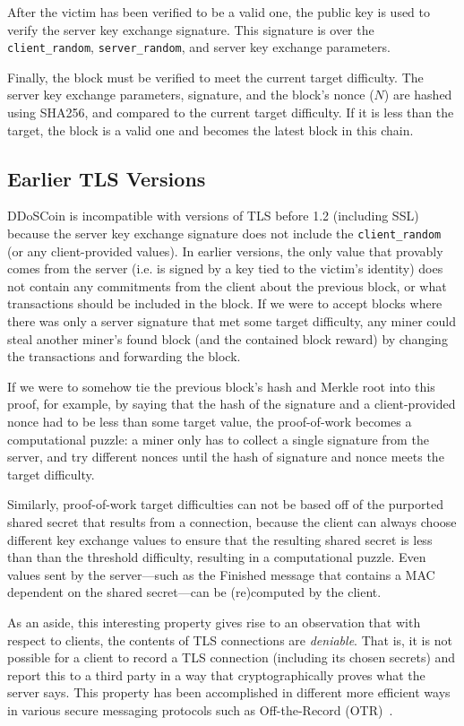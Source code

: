 After the victim has been verified to be a valid one, the public key is used to
verify the server key exchange signature. This signature is over the
\texttt{client\_random}, \texttt{server\_random}, and server key exchange
parameters.

Finally, the block must be verified to meet the current target difficulty. The
server key exchange parameters, signature, and the block's nonce ($N$) are
hashed using SHA256, and compared to the current target difficulty. If it is
less than the target, the block is a valid one and becomes the latest block in
this chain.

\subsection{Earlier TLS Versions}

DDoSCoin is incompatible with versions of TLS before 1.2 (including SSL) because
the server key exchange signature does not include the \texttt{client\_random}
(or any client-provided values). In earlier versions, the only value that
provably comes from the server (i.e.  is signed by a key tied to the victim's
identity) does not contain any commitments from the client about the previous
block, or what transactions should be included in the block. If we were to
accept blocks where there was only a server signature that met some target
difficulty, any miner could steal another miner's found block (and the contained
block reward) by changing the transactions and forwarding the block.

If we were to somehow tie the previous block's hash and Merkle root into this
proof, for example, by saying that the hash of the signature and a
client-provided nonce had to be less than some target value, the proof-of-work becomes
a computational puzzle: a miner only has to collect a single signature from
the server, and try different nonces until the hash of signature and nonce meets
the target difficulty.

Similarly, proof-of-work target difficulties can not be based off of the
purported shared secret that results from a connection, because the client can
always choose different key exchange values to ensure that the resulting shared
secret is less than than the threshold difficulty, resulting in a computational
puzzle. Even values sent by the server---such as the Finished message that
contains a MAC dependent on the shared secret---can be (re)computed by the client.

As an aside, this interesting property gives rise to an observation that with respect to
clients, the contents of TLS connections are \emph{deniable}. That is, it is not
possible for a client to record a TLS connection (including its chosen secrets)
and report this to a third party in a way that cryptographically proves what the
server says. This property has been accomplished in different more efficient ways in various
secure messaging protocols such as Off-the-Record (OTR)~\cite{otr}.

